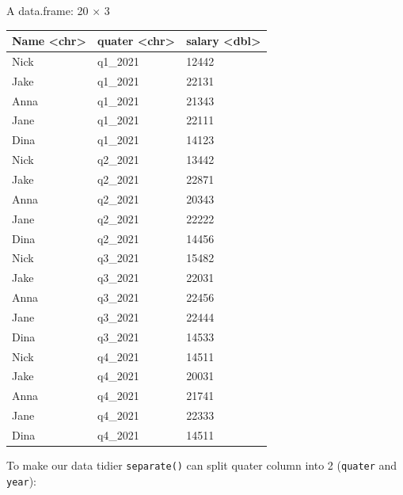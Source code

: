 \documentclass[
  letterpaper,
  DIV=11,
  numbers=noendperiod]{scrreprt}
\newenvironment{Shaded}{\begin{snugshade}}{\end{snugshade}}
\newcommand{\AttributeTok}[1]{\textcolor[rgb]{0.40,0.45,0.13}{#1}}
\newcommand{\CommentTok}[1]{\textcolor[rgb]{0.37,0.37,0.37}{#1}}
\newcommand{\DecValTok}[1]{\textcolor[rgb]{0.68,0.00,0.00}{#1}}
\newcommand{\FunctionTok}[1]{\textcolor[rgb]{0.28,0.35,0.67}{#1}}
\newcommand{\NormalTok}[1]{\textcolor[rgb]{0.00,0.23,0.31}{#1}}
\newcommand{\OtherTok}[1]{\textcolor[rgb]{0.00,0.23,0.31}{#1}}
\newcommand{\SpecialCharTok}[1]{\textcolor[rgb]{0.37,0.37,0.37}{#1}}
\newcommand{\StringTok}[1]{\textcolor[rgb]{0.13,0.47,0.30}{#1}}
\begin{document}
A data.frame: 20 × 3

\begin{longtable}[]{@{}lll@{}}
\toprule\noalign{}
Name \textless chr\textgreater{} & quater \textless chr\textgreater{} &
salary \textless dbl\textgreater{} \\
\midrule\noalign{}
\endhead
\bottomrule\noalign{}
\endlastfoot
Nick & q1\_2021 & 12442 \\
Jake & q1\_2021 & 22131 \\
Anna & q1\_2021 & 21343 \\
Jane & q1\_2021 & 22111 \\
Dina & q1\_2021 & 14123 \\
Nick & q2\_2021 & 13442 \\
Jake & q2\_2021 & 22871 \\
Anna & q2\_2021 & 20343 \\
Jane & q2\_2021 & 22222 \\
Dina & q2\_2021 & 14456 \\
Nick & q3\_2021 & 15482 \\
Jake & q3\_2021 & 22031 \\
Anna & q3\_2021 & 22456 \\
Jane & q3\_2021 & 22444 \\
Dina & q3\_2021 & 14533 \\
Nick & q4\_2021 & 14511 \\
Jake & q4\_2021 & 20031 \\
Anna & q4\_2021 & 21741 \\
Jane & q4\_2021 & 22333 \\
Dina & q4\_2021 & 14511 \\
\end{longtable}

To make our data tidier \texttt{separate()} can split quater column into
2 (\texttt{quater} and \texttt{year}):

\begin{Shaded}
\end{Shaded}
\end{document}

